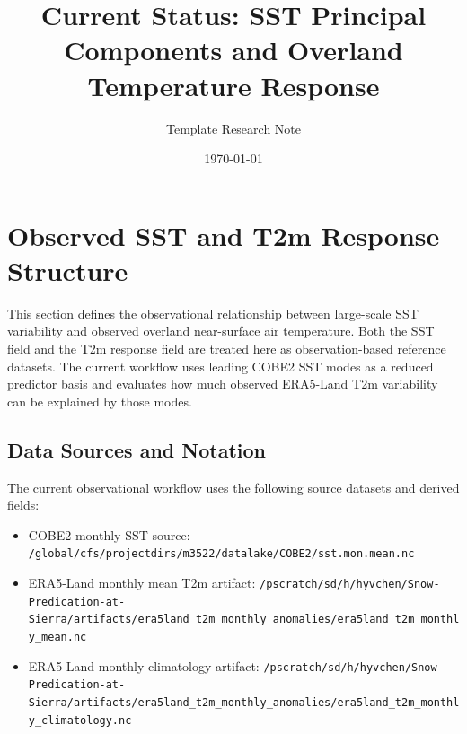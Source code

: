 \documentclass[11pt]{article}
\title{Current Status: SST Principal Components and Overland Temperature Response}
\author{Template Research Note}
\date{\today}
\begin{document}
\maketitle


\section{Observed SST and T2m Response Structure}
\label{sec:observed}

This section defines the observational relationship between large-scale SST variability and
observed overland near-surface air temperature. Both the SST field and the T2m response field
are treated here as observation-based reference datasets. The current workflow uses leading COBE2
SST modes as a reduced predictor basis and evaluates how much observed ERA5-Land T2m variability
can be explained by those modes.

\subsection{Data Sources and Notation}
\label{subsec:data_notation}

The current observational workflow uses the following source datasets and derived fields:
\begin{itemize}[leftmargin=1.5em]
  \item COBE2 monthly SST source:
  \texttt{/global/cfs/projectdirs/m3522/datalake/COBE2/sst.mon.mean.nc}
  \item ERA5-Land monthly mean T2m artifact:
  \texttt{/pscratch/sd/h/hyvchen/Snow-Predication-at-Sierra/artifacts/era5land\_t2m\_monthly\_anomalies/era5land\_t2m\_monthly\_mean.nc}
  \item ERA5-Land monthly climatology artifact:
  \texttt{/pscratch/sd/h/hyvchen/Snow-Predication-at-Sierra/artifacts/era5land\_t2m\_monthly\_anomalies/era5land\_t2m\_monthly\_climatology.nc}
\end{itemize}
\end{document}
